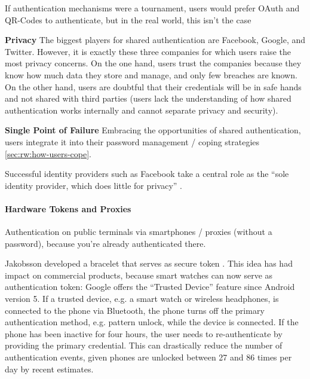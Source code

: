 	If authentication mechanisms were a tournament, users would prefer OAuth and QR-Codes to authenticate, but in the real world, this isn't the case \cite{Ruoti2015AuthenticationMelee}
	
	\textbf{Privacy} The biggest players for shared authentication are Facebook, Google, and Twitter. However, it is exactly these three companies for which users raise the most privacy concerns. On the one hand, users trust the companies because they know how much data they store and manage, and only few breaches are known. On the other hand, users are doubtful that their credentials will be in safe hands and not shared with third parties (users lack the understanding of how shared authentication works internally and cannot separate privacy and security). 
	
	\textbf{Single Point of Failure} Embracing the opportunities of shared authentication, users integrate it into their password management / coping strategies \ref{sec:rw:how-users-cope}. 
	
	Successful identity providers such as Facebook take a central role as the ``sole identity provider, which does 
	little for privacy'' \cite{Bonneau2015ImperfectAuthentication}.	

	\paragraph{Hardware Tokens and Proxies}
	Authentication on public terminals via smartphones / proxies (without a password), because you're already authenticated there. \cite{Roalter2013SmartphoneProxy}		
	
	Jakobsson developed a bracelet that serves as secure token \cite{Jakobsson2014HowToWearYourPW}. This idea has had impact on commercial products, because smart watches can now serve as authentication token: Google offers the ``Trusted Device'' feature since Android version 5. If a trusted device, e.g. a smart watch or wireless headphones, is connected to the phone via Bluetooth, the phone turns off the primary authentication method, e.g. pattern unlock, while the device is connected. If the phone has been inactive for four hours, the user needs to re-authenticate by providing the primary credential. This can drastically reduce the number of authentication events, given phones are unlocked between 27 and 86 times per day by recent estimates\cite{Deloitte2017ConsumerSurveyUS, Stachl2017PersonalitySmartphones}. 

